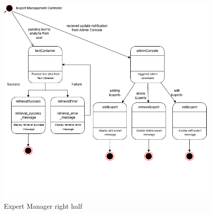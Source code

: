 \begin{figure}[H]
	\centering
	\includegraphics[width=\textwidth, height=\textheight, keepaspectratio]{Section2/images/Expert_Manager_state_diagram_right_half.png}
	\caption{Expert Manager right half}
	\label{ExpertManagerp1}
\end{figure}